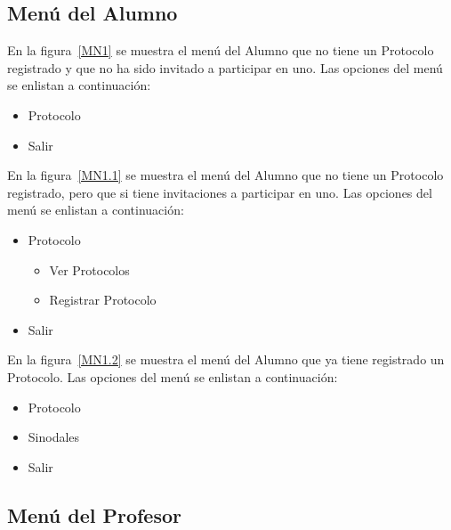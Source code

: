 \subsection{Menú del Alumno}	
	
		En la figura~\ref{MN1} se muestra el menú del Alumno que no tiene un Protocolo registrado y que no ha sido invitado a participar en uno. Las opciones del menú se enlistan a continuación:
	\begin{itemize}
		\item Protocolo
		\item Salir
	\end{itemize}
	


	En la figura~\ref{MN1.1} se muestra el menú del Alumno que no tiene un Protocolo registrado, pero que si tiene invitaciones a participar en uno. Las opciones del menú se enlistan a continuación:
	\begin{itemize}
		\item Protocolo
		\begin{itemize}
			\item Ver Protocolos
			\item Registrar Protocolo
		\end{itemize}
		\item Salir
	\end{itemize}
	


	En la figura~\ref{MN1.2} se muestra el menú del Alumno que ya tiene registrado un Protocolo. Las opciones del menú se enlistan a continuación:
	\begin{itemize}
		\item Protocolo
		\item Sinodales
		\item Salir
	\end{itemize}
	


\subsection{Menú del Profesor}

